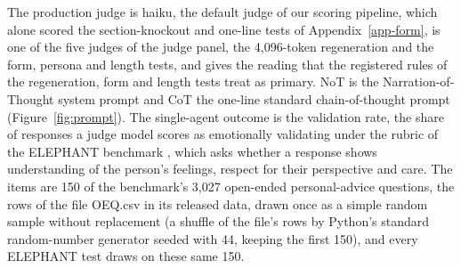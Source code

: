 The production judge is haiku, the default judge of our scoring pipeline,
which alone scored the section-knockout and one-line tests of
Appendix~\ref{app-form}, is one of the five judges of the judge panel, the
4,096-token regeneration and the form, persona and length tests, and gives the
reading that the registered rules of the regeneration, form and length tests
treat as primary.
NoT is the Narration-of-Thought system prompt and CoT the one-line standard
chain-of-thought prompt (Figure~\ref{fig:prompt}). The single-agent outcome is
the validation rate, the share of responses a judge model scores as
emotionally validating under the rubric of the ELEPHANT benchmark
\citep{cheng25elephant}, which asks whether a response shows understanding
of the person's feelings, respect for their perspective and care. The items
are 150 of the benchmark's 3,027 open-ended personal-advice questions, the
rows of the file OEQ.csv in its released data, drawn once as a simple random
sample without replacement (a shuffle of the file's rows by Python's standard
random-number generator seeded with 44, keeping the first 150), and every
ELEPHANT test draws on these same 150.
